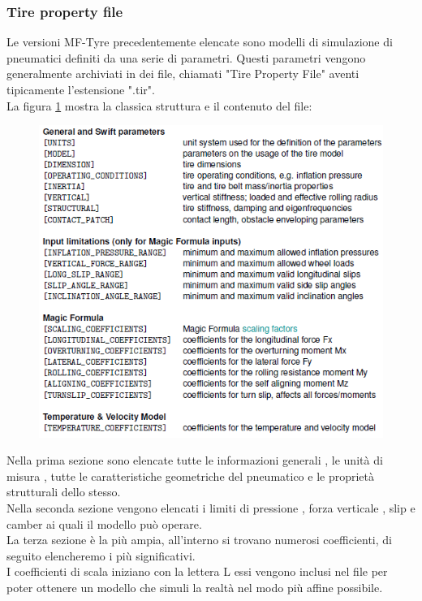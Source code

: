 \subsubsection{Tire property file}
Le versioni MF-Tyre precedentemente elencate sono modelli di simulazione di pneumatici definiti da una serie di parametri. Questi parametri vengono generalmente archiviati in dei file, chiamati "Tire Property File" aventi tipicamente l'estensione ".tir".\\ 
La figura \ref{fig:Structure_file_tir} mostra la classica struttura e il contenuto del file:\\
\begin{figure}[ht]
    \centering
    \includegraphics[scale=0.9]{Immagini/Tyres/Structure_file_tir.png}
    \caption{}
    \label{fig:Structure_file_tir}
\end{figure}
Nella prima sezione sono elencate tutte le informazioni generali , le unità di misura , tutte le caratteristiche geometriche del pneumatico
e le proprietà strutturali dello stesso.\\
Nella seconda sezione vengono elencati i limiti di pressione , forza verticale , slip e camber ai quali il modello può operare.\\
La terza sezione è la più ampia, all'interno si trovano numerosi coefficienti, di seguito elencheremo i più significativi.\\
I coefficienti di scala iniziano con la lettera L essi vengono inclusi nel file per poter ottenere un modello che simuli la realtà nel modo più affine possibile.
